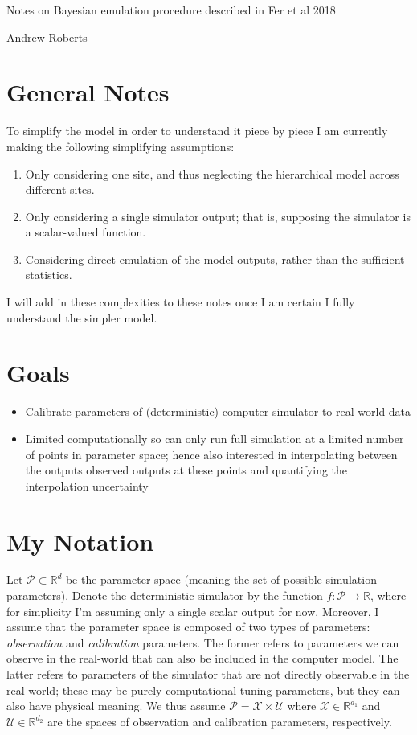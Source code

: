 \documentclass[12pt]{article}
\newcommand{\R}{\mathcal{R}}
\def\R{\mathbb{R}}
\begin{document}
\begin{center}
\Large
Notes on Bayesian emulation procedure described in Fer et al 2018
\end{center}

\begin{flushright}
Andrew Roberts
\end{flushright} 

\section{General Notes}
To simplify the model in order to understand it piece by piece I am currently making the following simplifying assumptions: 
\begin{enumerate}
\item Only considering one site, and thus neglecting the hierarchical model across different sites. 
\item Only considering a single simulator output; that is, supposing the simulator is a scalar-valued function.
\item Considering direct emulation of the model outputs, rather than the sufficient statistics.  
\end{enumerate}
I will add in these complexities to these notes once I am certain I fully understand the simpler model. 

\section{Goals}
\begin{itemize}
\item Calibrate parameters of (deterministic) computer simulator to real-world data
\item Limited computationally so can only run full simulation at a limited number of points in parameter space; hence also interested in interpolating between the 
outputs observed outputs at these points and quantifying the interpolation uncertainty
\end{itemize}

\section{My Notation}
Let $\mathcal{P} \subset \R^d$ be the parameter space (meaning the set of possible simulation parameters). Denote the deterministic simulator by the function $f: \mathcal{P} \to \R$, 
where for simplicity I'm assuming only a single scalar output for now. Moreover, I assume that the parameter space is composed of two types of parameters: \textit{observation}
and \textit{calibration} parameters. The former refers to parameters we can observe in the real-world that can also be included in the computer model. The latter refers
to parameters of the simulator that are not directly observable in the real-world; these may be purely computational tuning parameters, but they can also have physical meaning. 
We thus assume $\mathcal{P} = \mathcal{X} \times \mathcal{U}$ where $\mathcal{X} \in \R^{d_1}$ and $\mathcal{U} \in \R^{d_2}$ are the spaces of observation and calibration
parameters, respectively. 
\end{document}
